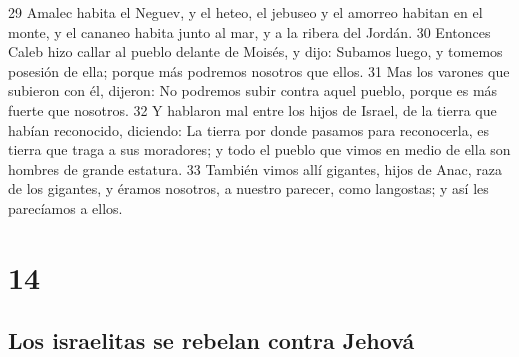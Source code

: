 29 Amalec habita el Neguev, y el heteo, el jebuseo y el amorreo habitan en el monte, y el cananeo habita junto al mar, y a la ribera del Jordán.
30 Entonces Caleb hizo callar al pueblo delante de Moisés, y dijo: Subamos luego, y tomemos posesión de ella; porque más podremos nosotros que ellos.
31 Mas los varones que subieron con él, dijeron: No podremos subir contra aquel pueblo, porque es más fuerte que nosotros.
32 Y hablaron mal entre los hijos de Israel, de la tierra que habían reconocido, diciendo: La tierra por donde pasamos para reconocerla, es tierra que traga a sus moradores; y todo el pueblo que vimos en medio de ella son hombres de grande estatura.
33 También vimos allí gigantes, hijos de Anac, raza de los gigantes, y éramos nosotros, a nuestro parecer, como langostas; y así les parecíamos a ellos.

\chapter{14}

\section*{Los israelitas se rebelan contra Jehová}


